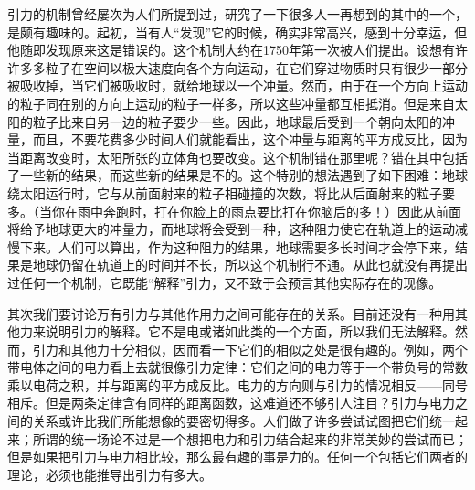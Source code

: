 \documentclass[12pt,oneside]{book}
\begin{document}
\begin{common-format}
引力的机制曾经屡次为人们所提到过，研究了一下很多人一再想到的其中的一个，是颇有趣味的。起初，当有人“发现”它的时候，确实非常高兴，感到十分幸运，但他随即发现原来这是错误的。这个机制大约在1750年第一次被人们提出。设想有许许多多粒子在空间以极大速度向各个方向运动，在它们穿过物质时只有很少一部分被吸收掉，当它们被吸收时，就给地球以一个冲量。然而，由于在一个方向上运动的粒子同在别的方向上运动的粒子一样多，所以这些冲量都互相抵消。但是来自太阳的粒子比来自另一边的粒子要少一些。因此，地球最后受到一个朝向太阳的冲量，而且，不要花费多少时间人们就能看出，这个冲量与距离的平方成反比，因为当距离改变时，太阳所张的立体角也要改变。这个机制错在那里呢？错在其中包括了一些新的结果，而这些新的结果是不的。这个特别的想法遇到了如下困难：地球绕太阳运行时，它与从前面射来的粒子相碰撞的次数，将比从后面射来的粒子要多。（当你在雨中奔跑时，打在你脸上的雨点要比打在你脑后的多！）因此从前面将给予地球更大的冲量力，而地球将会受到一种，这种阻力使它在轨道上的运动减慢下来。人们可以算出，作为这种阻力的结果，地球需要多长时间才会停下来，结果是地球仍留在轨道上的时间并不长，所以这个机制行不通。从此也就没有再提出过任何一个机制，它既能“解释”引力，又不致于会预言其他实际存在的现像。

其次我们要讨论万有引力与其他作用力之间可能存在的关系。目前还没有一种用其他力来说明引力的解释。它不是电或诸如此类的一个方面，所以我们无法解释。然而，引力和其他力十分相似，因而看一下它们的相似之处是很有趣的。例如，两个带电体之间的电力看上去就很像引力定律：它们之间的电力等于一个带负号的常数乘以电荷之积，并与距离的平方成反比。电力的方向则与引力的情况相反——同号相斥。但是两条定律含有同样的距离函数，这难道还不够引人注目？引力与电力之间的关系或许比我们所能想像的要密切得多。人们做了许多尝试试图把它们统一起来；所谓的统一场论不过是一个想把电力和引力结合起来的非常美妙的尝试而已；但是如果把引力与电力相比较，那么最有趣的事是力的。任何一个包括它们两者的理论，必须也能推导出引力有多大。


\end{common-format}
\end{document}
